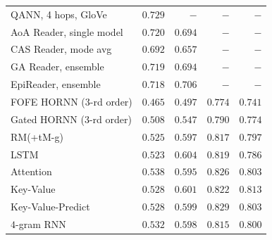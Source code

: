 \documentclass{article}
\begin{document}
\begin{figure}[t!]
{{\begin{tabular}{lrrrr}
QANN, 4 hops, GloVe \citep{weissenborn2016separating} & $\mathbf{0.729}$   &$-$ & $-$ & $-$    \\
AoA Reader, single model \citep{cui2016attention} & $0.720$   &$0.694$ & $-$ & $-$ \\
CAS Reader, mode avg \citep{cui2016consensus}     & $0.692$   &$0.657$ & $-$ & $-$    \\
GA Reader, ensemble \citep{dhingra2016gated}  & $0.719$   &$0.694$ & $-$ & $-$    \\
EpiReader, ensemble \citep{trischler2016natural} & $0.718$   &$\mathbf{0.706}$ & $-$ & $-$    \\
\midrule
FOFE HORNN (3-rd order) \citep{soltani2016higher}  & $0.465$   &$0.497$ & $0.774$ & $0.741$\\
Gated HORNN (3-rd order) \citep{soltani2016higher} & $0.508$   &$0.547$ & $0.790$ & $0.774$\\
RM(+tM-g) \citep{tran2016recurrent}  & $0.525$   & $0.597$ & $0.817$ & $0.797$\\ 
\midrule
LSTM     & $0.523$   &$0.604$ & $0.819$ & $0.786$ \\  
Attention & $0.538$   &$0.595$ & $0.826$ & $0.803$\\ 
Key-Value    & $0.528$   &$0.601$ & $0.822$ & $\mathbf{0.813}$ \\ 
Key-Value-Predict & $0.528$   &$0.599$ & $\mathbf{0.829}$ & $ 0.803$\\ 
\midrule
$4$-gram RNN   & $0.532$   &$0.598$ & $0.815$ & $0.800$\\ 
\bottomrule
\end{tabular}
}
}
\end{figure}
\end{document}
